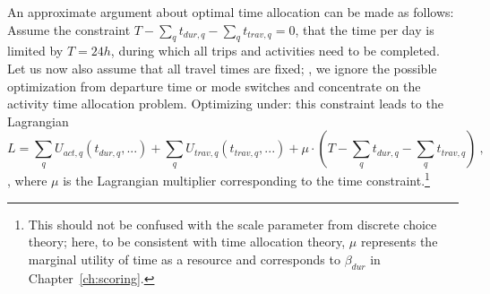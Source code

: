 An approximate argument about optimal time allocation can be made as follows:
Assume the constraint
$T - \sum_q t_{dur,q} - \sum_q t_{trav,q} = 0$, \ie that the time per day is limited by $T = 24h$, during which all trips and activities need to be completed.
%
%
%
Let us now also assume that all travel times are fixed; \ie, we ignore the possible optimization from departure time or mode switches and concentrate on the activity time allocation problem.
%
Optimizing under: 
this constraint leads to the Lagrangian
\begin{equation}
L = \sum_q U_{act,q}(t_{dur,q}, ...) + \sum_q U_{trav,q}(t_{trav,q}, ...)
%
%
+ \mu \cdot (T - \sum_q t_{dur,q} - \sum_q t_{trav,q})  \ ,
\label{eq:lagrangian}
\end{equation},
where $\mu$ is the Lagrangian multiplier corresponding to the time constraint.\footnote{%
%
This should not be confused with the scale parameter from discrete choice theory; here, to be consistent with time allocation theory, $\mu$ represents the marginal utility of time as a resource and corresponds to $\beta_{dur}$ in Chapter~\ref{ch:scoring}.
%
}


